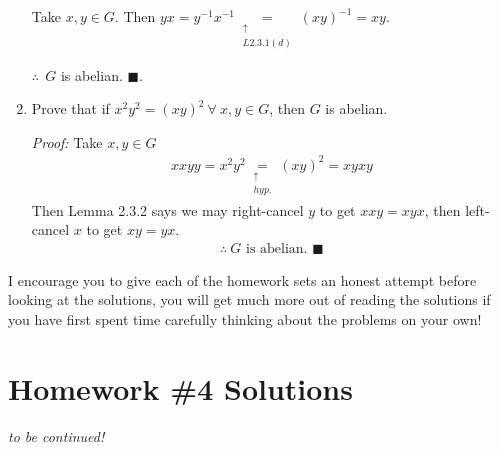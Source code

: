 \begin{enumerate}
Take $x,y \in G$. Then $yx = y^{-1}x^{-1} \underset{\substack{\uparrow \\ L2.3.1 (d)}}{=} (xy)^{-1} = xy$.

$\therefore \ \ G $ is abelian. $\blacksquare$.

\item Prove that if $x^2y^2 = (xy)^2 \ \forall \ x,y \in G$, then $G$ is abelian.

\textit{Proof:} Take $x,y \in G$
\begin{align*}
    xxyy = x^2y^2 \underset{\substack{\uparrow \\ hyp.}}{=} (xy)^2 = xyxy
\end{align*}
Then Lemma 2.3.2 says we may right-cancel $y$ to get $xxy = xyx$, then left-cancel $x$ to get $xy=yx$. 
\begin{align*}
    \therefore \ G \text{ is abelian. }\blacksquare 
\end{align*}
\end{enumerate}

\newpage

\begin{tcolorbox}
    I encourage you to give each of the homework sets an honest attempt before looking at the solutions, you will get much more out of reading the solutions if you have first spent time carefully thinking about the problems on your own!
\end{tcolorbox}
\vspace{-0.2in}
\section{Homework \#4 Solutions}

\textit{to be continued!}